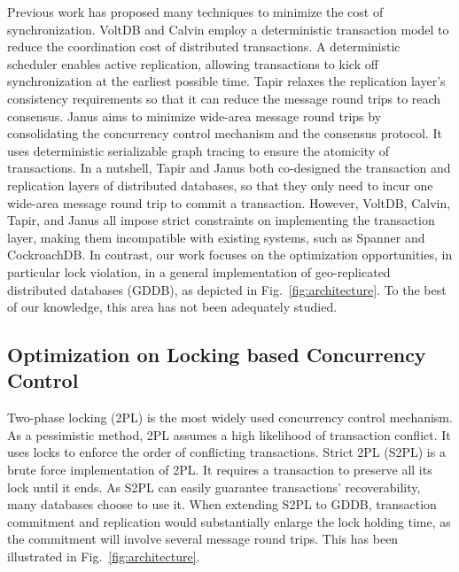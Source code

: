 \documentclass[conference]{IEEEtran}
\begin{document}
Previous work has proposed many techniques
to minimize the cost of synchronization.
VoltDB \cite{VoltDB} and Calvin \cite{Calvin:conf/sigmod/ThomsonDWRSA12} employ a deterministic transaction model
to reduce the coordination cost of distributed transactions.
A deterministic scheduler enables active replication, allowing transactions to kick off synchronization at the earliest possible time.
Tapir \cite{Tapir:conf/sosp/ZhangSSKP15} relaxes the replication layer's consistency requirements so that it can reduce the message round trips to reach consensus.
Janus \cite{Janus:conf/osdi/MuNLL16} aims to minimize wide-area message round trips
by consolidating the concurrency control mechanism and the consensus protocol.
It uses deterministic serializable graph tracing to ensure the atomicity of transactions.
In a nutshell, Tapir and Janus both co-designed the transaction and replication layers of distributed databases, so that they only need to incur one wide-area message round trip to commit a transaction.
However, VoltDB, Calvin, Tapir, and Janus all impose strict constraints on implementing the transaction layer, making them incompatible with existing systems, such as Spanner and CockroachDB.
In contrast, our work focuses on the optimization opportunities, in particular lock violation, in a general implementation of geo-replicated distributed databases (GDDB), as depicted in Fig.~\ref{fig:architecture}.
To the best of our knowledge, this area has not been adequately studied.

\subsection{Optimization on Locking based Concurrency Control}
Two-phase locking (2PL) is the most widely used concurrency control mechanism.
As a pessimistic method, 2PL assumes a high likelihood of transaction conflict.
It uses locks to enforce the order of conflicting transactions.
Strict 2PL (S2PL) is a brute force implementation of 2PL.
It requires a transaction to preserve all its lock until it ends.
As S2PL can easily guarantee transactions' recoverability, many databases choose to use it.
When extending S2PL to GDDB, transaction commitment and replication would substantially enlarge the lock holding time,
as the commitment will involve several message round trips. This has been illustrated in Fig.~\ref{fig:architecture}.
\end{document}

